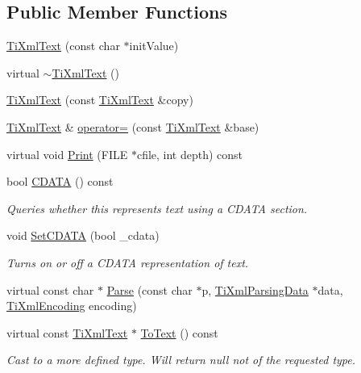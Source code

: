 \subsection*{Public Member Functions}
\begin{DoxyCompactItemize}
\item 
\hyperlink{class_ti_xml_text_af659e77c6b87d684827f35a8f4895960}{Ti\+Xml\+Text} (const char $\ast$init\+Value)
\item 
virtual \hyperlink{class_ti_xml_text_a829a4bd2d8d2461c333eb4f3f5b1b3d2}{$\sim$\+Ti\+Xml\+Text} ()
\item 
\hyperlink{class_ti_xml_text_a8d2cc1b4af2208cbb0171cf20f6815d1}{Ti\+Xml\+Text} (const \hyperlink{class_ti_xml_text}{Ti\+Xml\+Text} \&copy)
\item 
\hyperlink{class_ti_xml_text}{Ti\+Xml\+Text} \& \hyperlink{class_ti_xml_text_aed5b13f9c1b804c616fd533882c29f57}{operator=} (const \hyperlink{class_ti_xml_text}{Ti\+Xml\+Text} \&base)
\item 
virtual void \hyperlink{class_ti_xml_text_ae74d56c5b3ddec6cc3103dd51821af92}{Print} (F\+I\+LE $\ast$cfile, int depth) const 
\item 
bool \hyperlink{class_ti_xml_text_ad1a6a6b83fa2271022dd97c072a2b586}{C\+D\+A\+TA} () const 
\begin{DoxyCompactList}\small\item\em Queries whether this represents text using a C\+D\+A\+TA section. \end{DoxyCompactList}\item 
void \hyperlink{class_ti_xml_text_acb17ff7c5d09b2c839393445a3de5ea9}{Set\+C\+D\+A\+TA} (bool \+\_\+cdata)
\begin{DoxyCompactList}\small\item\em Turns on or off a C\+D\+A\+TA representation of text. \end{DoxyCompactList}\item 
virtual const char $\ast$ \hyperlink{class_ti_xml_text_a8d2dcfa41fc73d3e62dacc2fcf633819}{Parse} (const char $\ast$p, \hyperlink{class_ti_xml_parsing_data}{Ti\+Xml\+Parsing\+Data} $\ast$data, \hyperlink{tinyxml_8h_a88d51847a13ee0f4b4d320d03d2c4d96}{Ti\+Xml\+Encoding} encoding)
\item 
virtual const \hyperlink{class_ti_xml_text}{Ti\+Xml\+Text} $\ast$ \hyperlink{class_ti_xml_text_a895bf34ffad17f7439ab2a52b9651648}{To\+Text} () const 
\begin{DoxyCompactList}\small\item\em Cast to a more defined type. Will return null not of the requested type. \end{DoxyCompactList}\item 

\end{DoxyCompactItemize}
